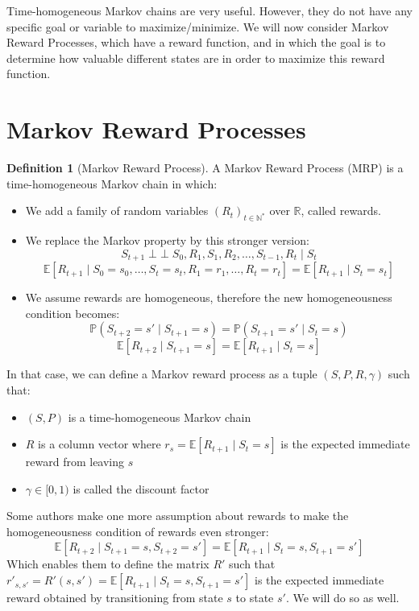 \documentclass{article}
\theoremstyle{definition}
\newtheorem{definition}{Definition}[section]
\theoremstyle{remark}
\theoremstyle{example}
\DeclareMathOperator{\ind}{\perp \!\!\! \perp}
\begin{document}
Time-homogeneous Markov chains are very useful. However, they do not have any specific goal or variable to maximize/minimize. We will now consider Markov Reward Processes, which have a reward function, and in which the goal is to determine how valuable different states are in order to maximize this reward function.

\section{Markov Reward Processes}

\begin{definition}[Markov Reward Process]
		A Markov Reward Process (MRP) is a time-homogeneous Markov chain in which:
		\begin{itemize}
				\item We add a family of random variables $(R_t)_{t \in \mathbb{N}^*}$ over $\mathbb{R}$, called rewards.
				\item We replace the Markov property by this stronger version:
						$$S_{t+1} \ind S_0, R_1, S_1, R_2, \dots, S_{t-1}, R_t \mid S_t$$
						$$\mathbb{E}[R_{t+1} \mid S_0 = s_0, \dots, S_t = s_t, R_1 = r_1, \dots, R_t = r_t] = \mathbb{E}[R_{t+1} \mid S_t = s_t]$$
				\item We assume rewards are homogeneous, therefore the new homogeneousness condition becomes:
						$$\mathbb{P}(S_{t+2} = s' \mid S_{t+1} = s) = \mathbb{P}(S_{t+1} = s' \mid S_t = s)$$
						$$\mathbb{E}[R_{t+2} \mid S_{t+1} = s] = \mathbb{E}[R_{t+1} \mid S_t = s]$$
		\end{itemize}
		In that case, we can define a Markov reward process as a tuple $(S, P, R, \gamma)$ such that:
		\begin{itemize}
				\item $(S, P)$ is a time-homogeneous Markov chain
				\item $R$ is a column vector where $r_s = \mathbb{E}[R_{t+1} \mid S_t = s]$ is the expected immediate reward from leaving $s$
				\item $\gamma \in [0, 1)$ is called the discount factor
		\end{itemize}
		Some authors make one more assumption about rewards to make the homogeneousness condition of rewards even stronger:
				$$\mathbb{E}[R_{t+2} \mid S_{t+1} = s, S_{t+2} = s'] = \mathbb{E}[R_{t+1} \mid S_t = s, S_{t+1} = s']$$
				Which enables them to define the matrix $R'$ such that $r'_{s,s'} = R'(s, s') = \mathbb{E}[R_{t+1} \mid S_t = s, S_{t+1} = s']$ is the expected immediate reward obtained by transitioning from state $s$ to state $s'$. We will do so as well.
\end{definition}
\end{document}
